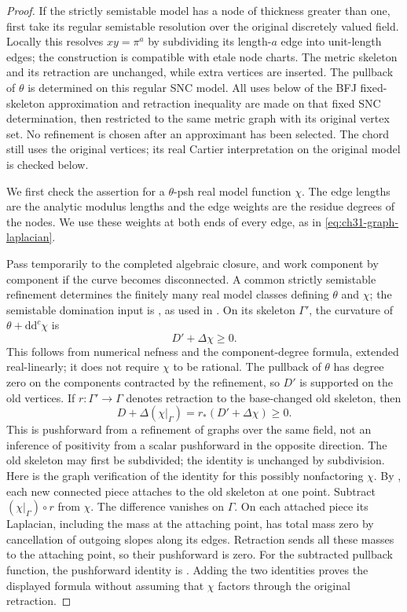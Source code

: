 \begin{proof}
If the strictly semistable model has a node of thickness greater than
one, first take its regular semistable resolution over the original
discretely valued field.  Locally this resolves \(xy=\pi^a\) by
subdividing its length-\(a\) edge into unit-length edges; the construction
is compatible with etale node charts.  The metric skeleton and its
retraction are unchanged, while extra vertices are inserted.
The pullback of \(\theta\) is determined on this regular SNC model.
All uses below of the BFJ fixed-skeleton approximation and retraction
inequality are made on that fixed SNC determination, then restricted
to the same metric graph with its original vertex set.  No refinement
is chosen after an approximant has been selected.  The chord still
uses the original vertices; its real Cartier interpretation on the
original model is checked below.

We first check the assertion for a \(\theta\)-psh real model
function \(\chi\).  The edge lengths are the analytic modulus
lengths and the edge weights are the residue degrees of the nodes.
We use these weights at both ends of every edge, as in
\eqref{eq:ch31-graph-laplacian}.

Pass temporarily to the completed algebraic closure, and work
component by component if the curve becomes disconnected.  A common
strictly semistable refinement determines the finitely many real
model classes defining \(\theta\) and \(\chi\); the semistable
domination input is \cite[\S7]{BL85}, as used in
\cite[proof of Proposition~3.7]{GJKM19}.  On its skeleton \(\Gamma'\),
the curvature of \(\theta+\mathrm d\mathrm d^c\chi\) is
\[
                      D'+\Delta\chi\geq0.
\]
This follows from numerical nefness and the component-degree formula,
extended real-linearly; it does not require \(\chi\) to be rational.
The pullback of \(\theta\) has degree zero on the components
contracted by the refinement, so \(D'\) is supported on the old
vertices.  If \(r:\Gamma'\to\Gamma\) denotes retraction to the
base-changed old skeleton, then
\[
      D+\Delta(\chi|_\Gamma)
          =r_*(D'+\Delta\chi)\geq0.
\]
This is pushforward from a refinement of graphs over the same field,
not an inference of positivity from a scalar pushforward in the
opposite direction.  The old skeleton may first be subdivided;
the identity is unchanged by subdivision.
Here is the graph verification of the identity for this possibly
nonfactoring \(\chi\).  By \cite[Proposition~2.2.26(iii)]{Thu05},
each new connected piece attaches to the old skeleton at one point.
Subtract \((\chi|_\Gamma)\circ r\) from \(\chi\).  The difference
vanishes on \(\Gamma\).  On each attached piece its Laplacian,
including the mass at the attaching point, has total mass zero by
cancellation of outgoing slopes along its edges.  Retraction sends
all these masses to the attaching point, so their pushforward is zero.
For the subtracted pullback function, the pushforward identity is
\cite[Proposition~2.2.26(iv)]{Thu05}.  Adding the two identities proves
the displayed formula without assuming that \(\chi\) factors
through the original retraction.


\end{proof}
